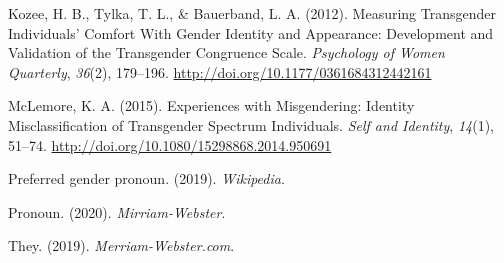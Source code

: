 \documentclass[12pt,twoside]{reedthesis}
\begin{document}
\leavevmode\hypertarget{ref-kozeeMeasuringTransgenderIndividuals2012}{}%
Kozee, H. B., Tylka, T. L., \& Bauerband, L. A. (2012). Measuring Transgender Individuals' Comfort With Gender Identity and Appearance: Development and Validation of the Transgender Congruence Scale. \emph{Psychology of Women Quarterly}, \emph{36}(2), 179--196. \url{http://doi.org/10.1177/0361684312442161}

\leavevmode\hypertarget{ref-mclemoreExperiencesMisgenderingIdentity2015}{}%
McLemore, K. A. (2015). Experiences with Misgendering: Identity Misclassification of Transgender Spectrum Individuals. \emph{Self and Identity}, \emph{14}(1), 51--74. \url{http://doi.org/10.1080/15298868.2014.950691}

\leavevmode\hypertarget{ref-PreferredGenderPronoun2019}{}%
Preferred gender pronoun. (2019). \emph{Wikipedia}.

\leavevmode\hypertarget{ref-Pronoun2020}{}%
Pronoun. (2020). \emph{Mirriam-Webster}.

\leavevmode\hypertarget{ref-They2019}{}%
They. (2019). \emph{Merriam-Webster.com}.


\end{document}
